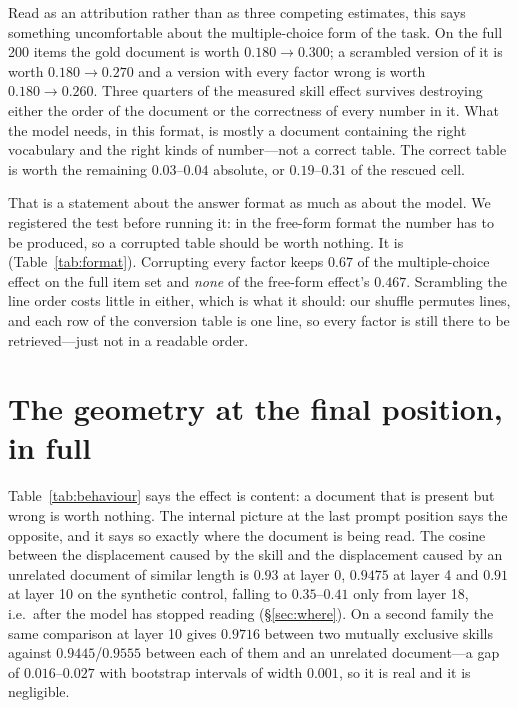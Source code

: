 \documentclass{article}
\begin{document}
Read as an attribution rather than as three competing estimates, this says
something uncomfortable about the multiple-choice form of the task. On the full
200 items the gold document is worth $0.180 \to 0.300$; a scrambled version of
it is worth $0.180 \to 0.270$ and a version with every factor wrong is worth
$0.180 \to 0.260$. Three quarters of the measured skill effect survives
destroying either the order of the document or the correctness of every number
in it. What the model needs, in this format, is mostly a document containing the
right vocabulary and the right kinds of number---not a correct table. The
correct table is worth the remaining $0.03$--$0.04$ absolute, or $0.19$--$0.31$
of the rescued cell.

That is a statement about the answer format as much as about the model. We
registered the test before running it: in the free-form format the number has to
be produced, so a corrupted table should be worth nothing. It is
(Table~\ref{tab:format}). Corrupting every factor keeps $0.67$ of the
multiple-choice effect on the full item set and \emph{none} of the free-form
effect's $0.467$. Scrambling the line order costs little in either, which is what it
should: our shuffle permutes lines, and each row of the conversion table is one
line, so every factor is still there to be retrieved---just not in a readable
order.


\section{The geometry at the final position, in full}
\label{app:geometry}

Table~\ref{tab:behaviour} says the effect is content: a document that is present
but wrong is worth nothing. The internal picture at the last prompt position says
the opposite, and it says so exactly where the document is being read. The cosine
between the displacement caused by the skill and the displacement caused by an
unrelated document of similar length is $0.93$ at layer 0, $0.9475$ at layer 4
and $0.91$ at layer 10 on the synthetic control, falling to $0.35$--$0.41$ only
from layer 18, i.e.\ after the model has stopped reading (\S\ref{sec:where}). On
a second family the same comparison at layer 10 gives $0.9716$ between two
mutually exclusive skills against $0.9445$/$0.9555$ between each of them and an
unrelated document---a gap of $0.016$--$0.027$ with bootstrap intervals of width
$0.001$, so it is real and it is negligible.
\end{document}
